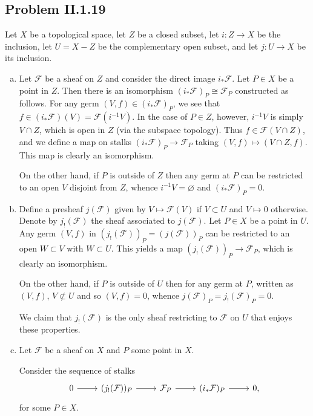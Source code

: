 \documentclass{mathnotes}
\begin{document}
\subsection*{Problem II.1.19}
Let $X$ be a topological space, let $Z$ be a closed subset, let $i:Z\to X$ be the inclusion, let $U=X-Z$ be the complementary
open subset, and let $j:U\to X$ be its inclusion.
\begin{enumerate}[(a)]
    \item Let $\mathcal{F}$ be a sheaf on $Z$ and consider the direct image $i_*\mathcal{F}$. Let $P\in X$ be a point in $Z$.
        Then there is an isomorphism $(i_*\mathcal{F})_P\cong\mathcal{F}_P$ constructed as follows. For any germ $(V,f)\in(i_*\mathcal{F})_P$,
        we see that $f\in (i_*\mathcal{F})(V)=\mathcal{F}(i^{-1}V)$. In the case of $P\in Z$, however, $i^{-1}V$ is simply $V\cap Z$,
        which is open in $Z$ (via the subspace topology). Thus $f\in\mathcal{F}(V\cap Z)$, and we define a map on stalks $(i_*\mathcal{F})_P\to\mathcal{F}_P$
        taking $(V,f)\mapsto (V\cap Z,f)$. This map is clearly an isomorphism.
        
        On the other hand, if $P$ is outside of $Z$ then any germ at $P$ can be restricted to an open $V$ disjoint from $Z$, whence
        $i^{-1}V=\varnothing$ and $(i_*\mathcal{F})_P=0$.
    \item Define a presheaf $j(\mathcal{F})$ given by $V\mapsto\mathcal{F}(V)$ if $V\subset U$ and $V\mapsto 0$ otherwise. Denote
        by $j_!(\mathcal{F})$ the sheaf associated to $j(\mathcal{F})$. Let $P\in X$ be a point in $U$. Any germ $(V,f)$ in
        $(j_!(\mathcal{F}))_P=(j(\mathcal{F}))_P$ can be restricted to an open $W\subset V$ with $W\subset U$. This yields
        a map $(j_!(\mathcal{F}))_P\to\mathcal{F}_P$, which is clearly an isomorphism.

        On the other hand, if $P$ is outside of $U$ then for any germ at $P$, written as $(V,f)$, $V\not\subset U$ and so $(V,f)=0$,
        whence $j(\mathcal{F})_P=j_!(\mathcal{F})_P=0$.

        We claim that $j_!(\mathcal{F})$ is the only sheaf restricting to $\mathcal{F}$ on $U$ that enjoys these properties.
    \item Let $\mathcal{F}$ be a sheaf on $X$ and $P$ some point in $X$.
        
        Consider the sequence of stalks
        \begin{equation*}
            \begin{tikzcd}
                0\ar{r} & (j_!(\mathcal{F}))_P\ar{r} & \mathcal{F}_P\ar{r} & (i_*\mathcal{F})_P\ar{r} & 0,
            \end{tikzcd}
        \end{equation*}
        for some $P\in X$.


\end{enumerate}
\end{document}

